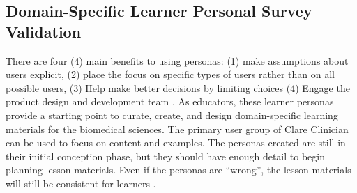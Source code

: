 \documentclass[020-persona\_validation.tex]{subfiles}
\begin{document}
    \subsection{Domain-Specific Learner Personal Survey Validation}

        There are four (4) main benefits to using personas:
        (1) make assumptions about users explicit,
        (2) place the focus on specific types of users rather than on all possible users,
        (3) Help make better decisions by limiting choices
        (4) Engage the product design and development team
        \cite{pruittPersonaLifecycleKeeping2006, schwartzParadoxChoiceWhy2016}.
        As educators, these learner personas provide a starting point to curate, create, and design
        domain-specific learning materials for the biomedical sciences.
        The primary user group of Clare Clinician can be used to focus on content and examples.
        The personas created are still in their initial conception phase,
        but they should have enough detail to begin planning lesson materials.
        Even if the personas are ``wrong'',
        the lesson materials will still be consistent for learners
        \cite{pruittPersonaLifecycleKeeping2006}.
\end{document}
